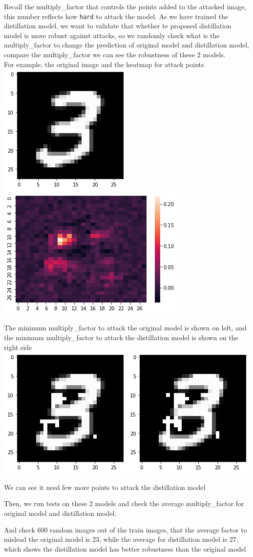 \documentclass[
]{article}
\begin{document}
\begin{enumerate}
  Recall the multiply\_factor that controls the points added to the
  attacked image, this number reflects how \texttt{hard} to attack the
  model. As we have trained the distillation model, we want to validate
  that whether te proposed distillation model is more robust against
  attacks, so we randomly check what is the multiply\_factor to change
  the prediction of original model and distillation model, compare the
  multiply\_factor we can see the robustness of these 2 models.\\
  For example, the original image and the heatmap for attack points
  \includegraphics[width=0.25\columnwidth]{assets/output6.png} \includegraphics[width=0.5\columnwidth]{assets/output7.png}

  The minimum multiply\_factor to attack the original model is shown on
  left, and the minimum multiply\_factor to attack the distillation
  model is shown on the right side\\
  \includegraphics[width=0.25\columnwidth]{assets/output8.png}\includegraphics[width=0.25\columnwidth]{assets/output9.png}

  We can see it need few more points to attack the distillation model

  Then, we run tests on these 2 models and check the average
  multiply\_factor for original model and distillation model.

  And check 600 random images out of the train images, that the average
  factor to mislead the original model is 23, while the average for
  distillation model is 27, which shows the distillation model has
  better robustness than the original model
\end{enumerate}
\end{document}
